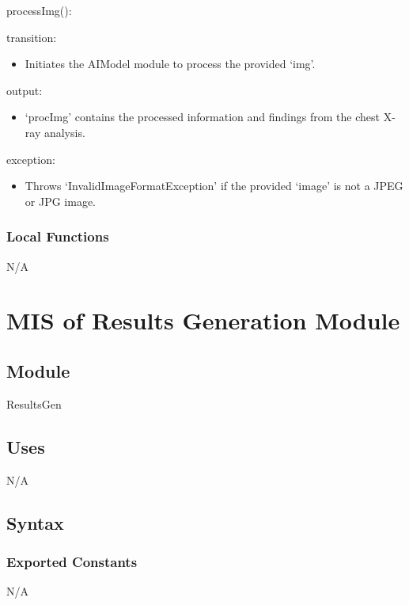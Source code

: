 \documentclass[12pt, titlepage]{article}
\begin{document}
\noindent processImg():
\begin{itemize}
  \begin{item}
    transition:
    \begin{itemize}
      \item Initiates the AIModel module to process the provided `img'.
    \end{itemize}
  \end{item}
  \begin{item}
    output:
    \begin{itemize}
      \item `procImg' contains the processed information and findings from the
        chest X-ray analysis.
    \end{itemize}
  \end{item}
  \begin{item}
    exception:
    \begin{itemize}
      \item Throws `InvalidImageFormatException' if the provided `image' is
        not a JPEG or JPG image. 
    \end{itemize}
  \end{item}
\end{itemize}

\subsubsection{Local Functions}
N/A

\newpage

\section{MIS of Results Generation Module} \label{mResGen}

\subsection{Module}
ResultsGen

\subsection{Uses}
N/A

\subsection{Syntax}

\subsubsection{Exported Constants}
N/A
\end{document}
